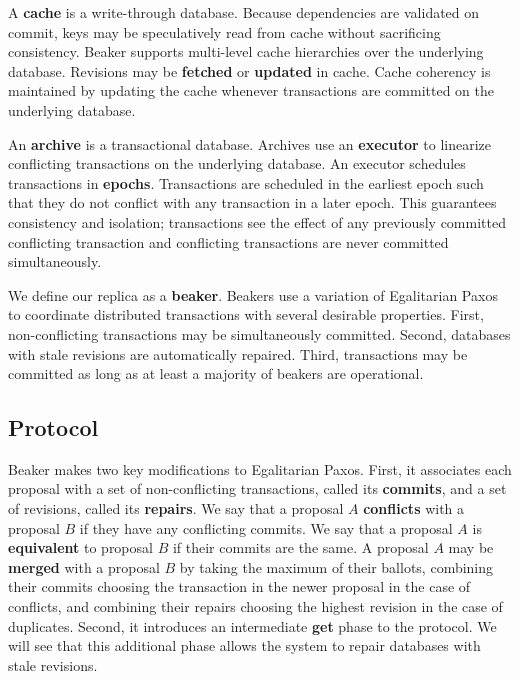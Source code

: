 \documentclass[../main.tex]{subfiles}
\begin{document}
  A \textbf{cache} is a write-through database. Because dependencies are validated on commit, keys
  may be speculatively read from cache without sacrificing consistency. Beaker supports multi-level
  cache hierarchies over the underlying database. Revisions may be \textbf{fetched} or
  \textbf{updated} in cache. Cache coherency is maintained by updating the cache whenever
  transactions are committed on the underlying database.

  An \textbf{archive} is a transactional database. Archives use an \textbf{executor} to linearize
  conflicting transactions on the underlying database. An executor schedules transactions in
  \textbf{epochs}. Transactions are scheduled in the earliest epoch such that they do not conflict
  with any transaction in a later epoch. This guarantees consistency and isolation; transactions
  see the effect of any previously committed conflicting transaction and conflicting transactions
  are never committed simultaneously.

  We define our replica as a \textbf{beaker}. Beakers use a variation of Egalitarian Paxos to
  coordinate distributed transactions with several desirable properties. First, non-conflicting
  transactions may be simultaneously committed. Second, databases with stale revisions are
  automatically repaired. Third, transactions may be committed as long as at least a majority of
  beakers are operational.

  \subsection{Protocol}
  Beaker makes two key modifications to Egalitarian Paxos. First, it associates each proposal with
  a set of non-conflicting transactions, called its \textbf{commits}, and a set of revisions,
  called its \textbf{repairs}. We say that a proposal $A$ \textbf{conflicts} with a proposal $B$ if
  they have any conflicting commits. We say that a proposal $A$ is \textbf{equivalent} to proposal
  $B$ if their commits are the same. A proposal $A$ may be \textbf{merged} with a proposal $B$ by
  taking the maximum of their ballots, combining their commits choosing the transaction in the
  newer proposal in the case of conflicts, and combining their repairs choosing the highest
  revision in the case of duplicates. Second, it introduces an intermediate \textbf{get} phase to
  the protocol. We will see that this additional phase allows the system to repair databases with
  stale revisions.
\end{document}
